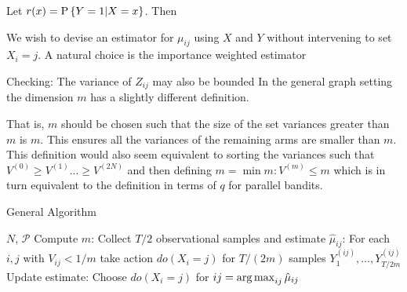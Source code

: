 Let $r(x) = \P{Y = 1|X = x}$. Then



We wish to devise an estimator for $\mu_{ij}$ using $X$ and $Y$ without
intervening to set $X_i = j$. A natural choice is the importance weighted estimator


Checking:
The variance of $Z_{ij}$ may also be bounded
In the general graph setting the dimension $m$ has a slightly different definition.



That is, $m$ should be chosen such that the size of the set variances greater than $m$ is $m$. This ensures all the variances of the remaining arms are smaller than $m$. This definition would also seem equivalent to sorting the variances such that $V^{(0)} \geq V^{(1)} ... \geq V^{(2N)}$ and then defining $m = \min m: V^{(m)} \leq m$ which is in turn equivalent to the definition in terms of $q$ for parallel bandits. 

\begin{algorithm}[H]
\caption{General Algorithm}
\begin{algorithmic}
 $N$, $\mathcal P$
\STATE Compute $m$:
\STATE Collect $T/2$ observational samples and estimate $\hat \mu_{ij}$:
\STATE For each $i,j $ with $V_{ij} < 1/m$ take action $do(X_i = j)$ for $T/(2m)$ samples $Y^{(ij)}_1,\ldots,Y^{(ij)}_{T/2m}$
\STATE Update estimate:
\ENDFOR
\STATE Choose $do(X_i = j)$ for $ij = \argmax_{ij} \hat \mu_{ij}$
\end{algorithmic}
\end{algorithm}





